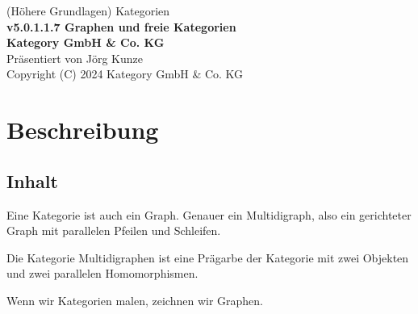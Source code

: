 \documentclass[a4paper]{amsart}
\theoremstyle{definition}
\begin{document}
\begin{titlepage}
\centering
{\huge
(Höhere Grundlagen) Kategorien\\[1cm]
\textbf{v5.0.1.1.7 Graphen und freie Kategorien}
}\\[1cm]

\textbf{Kategory GmbH \& Co. KG}\\
Präsentiert von Jörg Kunze\\
Copyright (C) 2024 Kategory GmbH \& Co. KG

\end{titlepage}

%

\newpage

\section*{Beschreibung}

\subsection*{Inhalt}
Eine Kategorie ist auch ein Graph. Genauer ein Multidigraph, also ein gerichteter Graph mit parallelen Pfeilen und Schleifen.

Die Kategorie Multidigraphen ist eine Prägarbe der Kategorie mit zwei Objekten und zwei parallelen Homomorphismen.

Wenn wir Kategorien malen, zeichnen wir Graphen.
\end{document}
